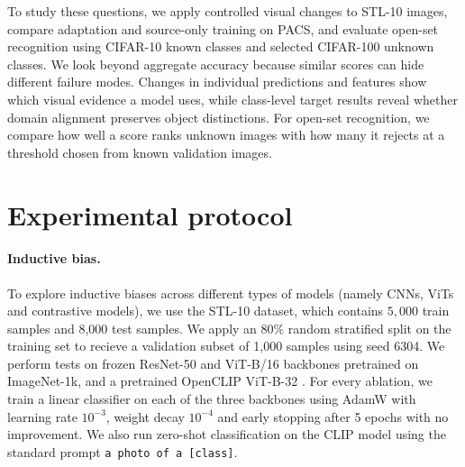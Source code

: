 \documentclass{article}
\begin{document}
To study these questions, we apply controlled visual changes to STL-10 images, compare adaptation and source-only training on PACS, and evaluate open-set recognition using CIFAR-10 known classes and selected CIFAR-100 unknown classes. We look beyond aggregate accuracy because similar scores can hide different failure modes. Changes in individual predictions and features show which visual evidence a model uses, while class-level target results reveal whether domain alignment preserves object distinctions. For open-set recognition, we compare how well a score ranks unknown images with how many it rejects at a threshold chosen from known validation images.

\section{Experimental protocol}
\paragraph{Inductive bias.}\mbox{}\par

To explore inductive biases across different types of models (namely CNNs, ViTs and contrastive models), we use the STL-10 dataset, which contains $5{,}000$ train samples and 8,000 test samples. We apply an $80\%$ random stratified split on the training set to recieve a validation subset of 1,000 samples using seed 6304. We perform tests on frozen ResNet-50 \citep{he2016resnet} and ViT-B/16 \citep{dosovitskiy2021vit} backbones pretrained on ImageNet-1k, and a pretrained OpenCLIP ViT-B-32 \citep{radford2021clip}.
For every ablation, we train a linear classifier on each of the three backbones using AdamW with learning rate $10^{-3}$, weight decay $10^{-4}$ and early stopping after 5 epochs with no improvement. We also run zero-shot classification on the CLIP model using the standard prompt \texttt{a photo of a [class]}.
\end{document}
